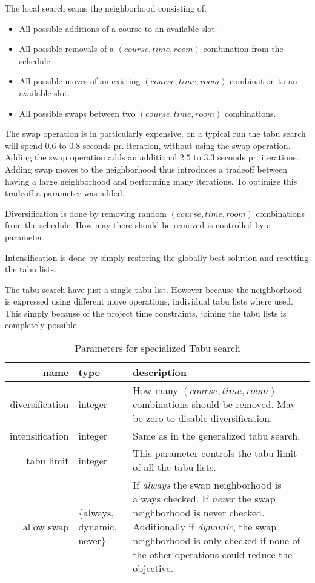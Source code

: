 The local search scans the neighborhood consisting of:
\begin{itemize}
\item All possible additions of a course to an available slot.
\item All possible removals of a $(course, time, room)$ combination from the schedule.
\item All possible moves of an existing $(course, time, room)$ combination to an available slot.
\item All possible swaps between two $(course, time, room)$ combinations.
\end{itemize}

The swap operation is in particularly expensive, on a typical run the tabu search will spend $0.6$ to $0.8$ seconds pr. iteration, without using the swap operation. Adding the swap operation adds an additional $2.5$ to $3.3$ seconds pr. iterations. Adding swap moves to the neighborhood thus introduces a tradeoff between having a large neighborhood and performing many iterations. To optimize this tradeoff a parameter was added.

Diversification is done by removing random $(course, time, room)$ combinations from the schedule. How may there should be removed is controlled by a parameter.

Intensification is done by simply restoring the globally best solution and resetting the tabu lists.

The tabu search have just a single tabu list. However because the neighborhood is expressed using different move operations, individual tabu lists where used. This simply because of the project time constraints, joining the tabu lists is completely possible.

\begin{table}[H]
\centering
\begin{tabular}{r|p{2cm}|p{6cm}}
	name & type & description \\ \hline
	diversification & integer & How many $(course, time, room)$ combinations should be removed. May be zero to disable diversification. \\
	intensification & integer & Same as in the generalized tabu search. \\
	tabu limit & integer & This parameter controls the tabu limit of all the tabu lists. \\
	allow swap & $\{$always, dynamic, never$\}$ & If \textit{always} the swap neighborhood is always checked. If \textit{never} the swap neighborhood is never checked. Additionally if \textit{dynamic}, the swap neighborhood is only checked if none of the other operations could reduce the objective.
\end{tabular}
\caption{Parameters for specialized Tabu search}
\end{table}


